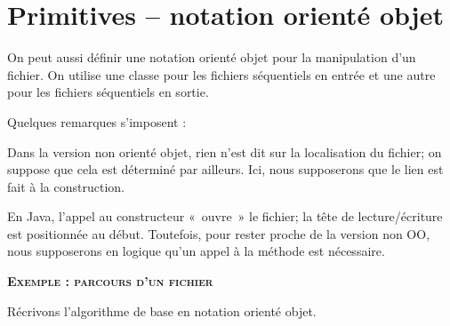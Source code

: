 \section{Primitives – notation orienté objet}

On peut aussi définir une notation orienté objet pour la manipulation
d'un fichier. On utilise une classe pour les fichiers
séquentiels en entrée et une autre pour les fichiers séquentiels en
sortie.


\bigskip



Quelques remarques s'imposent :

\begin{liste}
	\item 
		Dans la version non orienté objet, rien n'est dit sur
		la localisation du fichier; on suppose que cela est déterminé par
		ailleurs. Ici, nous supposerons que le lien est fait à la
		construction.
	\item 
		En Java, l'appel au constructeur «~ouvre~» le fichier;
		la tête de lecture/écriture est positionnée au début. Toutefois, pour
		rester proche de la version non OO, nous supposerons en logique
		qu'un appel à la méthode 
		est nécessaire.
\end{liste}

{\sffamily\bfseries\scshape
Exemple : parcours d'un fichier}

Récrivons l'algorithme de base en notation orienté
objet.


